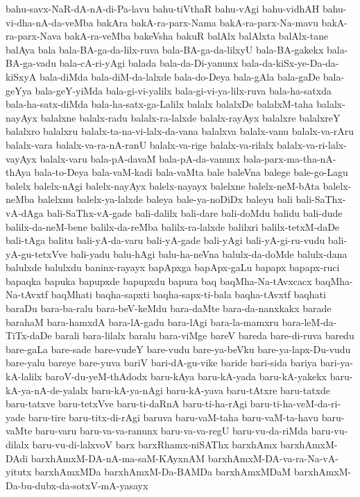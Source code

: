 {bahu-savx-NaR-dA-nA-di-Pa-lavu
bahu-tiVthaR
bahu-vAgi
bahu-vidhAH
bahu-vi-dha-nA-da-veMba
bakAra
bakA-ra-parx-Nama
bakA-ra-parx-Na-mavu
bakA-ra-parx-Nava
bakA-ra-veMba
bakeVsha
bakuR
balAlx
balAlxta
balAlx-tane
balAya
bala
bala-BA-ga-da-lilx-ruva
bala-BA-ga-da-lilxyU
bala-BA-gakekx
bala-BA-ga-vadu
bala-cA-ri-yAgi
balada
bala-da-Di-yanunx
bala-da-kiSx-ye-Da-da-kiSxyA
bala-diMda
bala-diM-da-lalxde
bala-do-Deya
bala-gAla
bala-gaDe
bala-geYya
bala-geY-yiMda
bala-gi-vi-yalilx
bala-gi-vi-ya-lilx-ruva
bala-ha-satxda
bala-ha-satx-diMda
bala-ha-satx-ga-Lalilx
balalx
balalxDe
balalxM-taha
balalx-nayAyx
balalxne
balalx-radu
balalx-ra-lalxde
balalx-rayAyx
balalxre
balalxreY
balalxro
balalxru
balalx-ta-na-vi-lalx-da-vana
balalxva
balalx-vanu
balalx-va-rAru
balalx-vara
balalx-va-ra-nA-ranU
balalx-va-rige
balalx-va-rilalx
balalx-va-ri-lalx-vayAyx
balalx-varu
bala-pA-davaM
bala-pA-da-vanunx
bala-parx-ma-tha-nA-thAya
bala-to-Deya
bala-vaM-kadi
bala-vaMta
bale
baleVna
balege
bale-go-Lagu
balelx
balelx-nAgi
balelx-nayAyx
balelx-nayayx
balelxne
balelx-neM-bAta
balelx-neMba
balelxnu
balelx-ya-lalxde
baleya
bale-ya-noDiDx
baleyu
bali
bali-SaThx-vA-dAga
bali-SaThx-vA-gade
bali-dalilx
bali-dare
bali-doMdu
balidu
bali-dude
balilx-da-neM-bene
balilx-da-reMba
balilx-ra-lalxde
balilxri
balilx-tetxM-daDe
bali-tAga
balitu
bali-yA-da-varu
bali-yA-gade
bali-yAgi
bali-yA-gi-ru-vudu
bali-yA-gu-tetxVve
bali-yadu
balu-hAgi
balu-ha-neVna
balulx-da-doMde
balulx-dana
balulxde
balulxdu
baninx-rayayx
bapApxga
bapApx-gaLu
bapapx
bapapx-ruci
bapaqka
bapuka
bapupxde
bapupxdu
bapura
baq
baqMha-Na-tAvxcacx
baqMha-Na-tAvxtf
baqMhati
baqha-sapxti
baqha-sapx-ti-bala
baqha-tAvxtf
baqhati
baraDu
bara-ba-ralu
bara-beV-keMdu
bara-daMte
bara-da-nanxkakx
barade
barahaM
bara-hamxdA
bara-lA-gadu
bara-lAgi
bara-la-mamxru
bara-leM-da-TiTx-daDe
barali
bara-lilalx
baralu
bara-viMge
bareV
bareda
bare-di-ruva
baredu
bare-gaLa
bare-sade
bare-vudeY
bare-vudu
bare-ya-beVku
bare-ya-lapx-Du-vudu
bare-yalu
bareye
bare-yuva
bariV
bari-dA-gu-vike
baride
bari-sida
bariya
bari-ya-kA-lalilx
baroV-du-yeM-thAdodx
baru-kAya
baru-kA-yada
baru-kA-yakekx
baru-kA-ya-nA-de-yalalx
baru-kA-ya-nAgi
baru-kA-yava
baru-tAtxre
baru-tatxde
baru-tatxve
baru-tetxVve
baru-ti-daRnA
baru-ti-ha-rAgi
baru-ti-ha-veM-da-ri-yade
baru-tire
baru-titx-di-rAgi
baruva
baru-vaM-taha
baru-vaM-ta-havu
baru-vaMte
baru-varu
baru-va-va-ranunx
baru-va-va-regU
baru-vu-da-riMda
baru-vu-dilalx
baru-vu-di-lalxvoV
barx
barxRhamx-niSAThx
barxhAmx
barxhAmxM-DAdi
barxhAmxM-DA-nA-ma-saM-KAyxnAM
barxhAmxM-DA-va-ra-Na-vA-yitutx
barxhAmxMDa
barxhAmxM-Da-BAMDa
barxhAmxMDaM
barxhAmxM-Da-bu-dubx-da-sotxV-mA-yasayx
}
